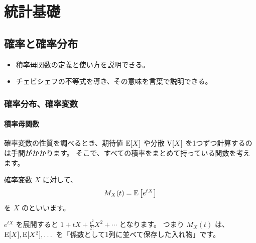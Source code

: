 



\part{統計基礎}

\chapter{確率と確率分布}
\label{chap:sample}

\begin{chaptergoal}
  \begin{itemize}
    \item 積率母関数の定義と使い方を説明できる。
    \item チェビシェフの不等式を導き、その意味を言葉で説明できる。
  \end{itemize}
\end{chaptergoal}

\section{確率分布、確率変数}
\label{sec:sample-moments}


\subsection{積率母関数}

確率変数の性質を調べるとき、期待値 $\mathrm{E}[X]$ や分散 $\mathrm{V}[X]$ を1つずつ計算するのは手間がかかります。
そこで、すべての積率をまとめて持っている関数を考えます。

\begin{definition}
  確率変数 $X$ に対して、
  \begin{equation}
    M_X(t) = \mathrm{E}\left[e^{tX}\right]
    \label{eq:mgf}
  \end{equation}
  を $X$ のといいます。
\end{definition}

\begin{intuition}
  $e^{tX}$ を展開すると $1 + tX + \frac{t^2}{2!}X^2 + \cdots$ となります。
  つまり $M_X(t)$ は、$\mathrm{E}[X], \mathrm{E}[X^2], \dots$ を「係数として1列に並べて保存した入れ物」です。
\end{intuition}

